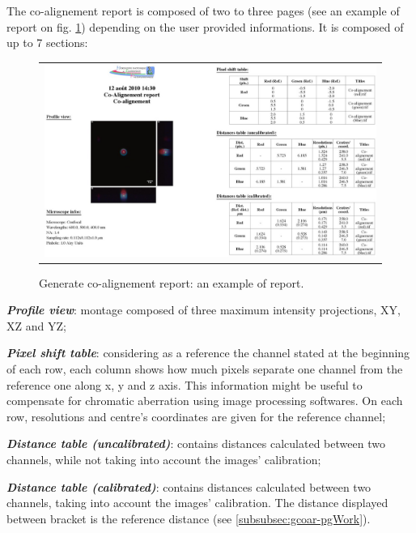 \documentclass[]{spie}
\begin{document}
The co-alignement report is composed of two to three pages (see an example of report on fig. \ref{fig:gcoar-report}) depending on the user provided informations. It is composed of up to 7 sections:
\begin{figure}[h]
		\begin{center}
		\begin{tabular}{c}
			\includegraphics[width=0.9\linewidth]{img/gcoar-report}
		\end{tabular}
	\end{center}
	\caption{\label{fig:gcoar-report}Generate co-alignement report: an example of report.}
\end{figure} 
\begin{itemize*}
	\item \textbf{\textit{Profile view}}: montage composed of three maximum intensity projections, XY, XZ and YZ;
	\item \textbf{\textit{Pixel shift table}}: considering as a reference the channel stated at the beginning of each row, each column shows how much pixels separate one channel from the reference one along x, y and z axis. This information might be useful to compensate for chromatic aberration using image processing softwares. On each row, resolutions and centre's coordinates are given for the reference channel;
	\item \textbf{\textit{Distance table (uncalibrated)}}: contains distances calculated between two channels, while not taking into account the images' calibration;
	\item \textbf{\textit{Distance table (calibrated)}}: contains distances calculated between two channels, taking into account the images' calibration. The distance displayed between bracket is the reference distance (see \ref{subsubsec:gcoar-pgWork}).
\end{itemize*}
\end{document}
